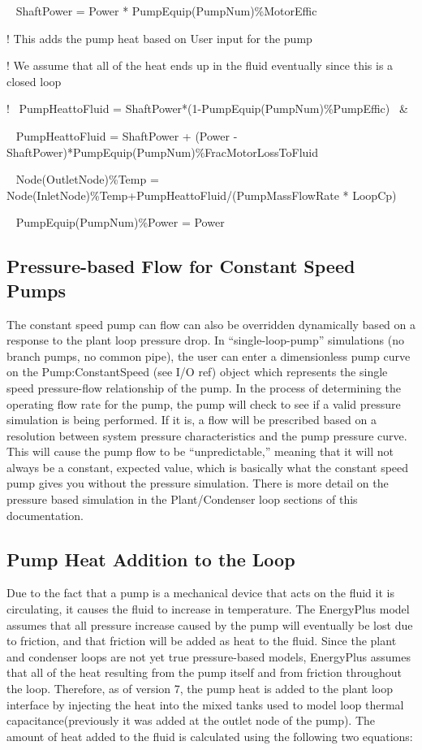 ~ ShaftPower = Power * PumpEquip(PumpNum)\%MotorEffic

! This adds the pump heat based on User input for the pump

! We assume that all of the heat ends up in the fluid eventually since this is a closed loop

! ~PumpHeattoFluid = ShaftPower*(1-PumpEquip(PumpNum)\%PumpEffic)~ \&

~ PumpHeattoFluid = ShaftPower + (Power - ShaftPower)*PumpEquip(PumpNum)\%FracMotorLossToFluid

~ Node(OutletNode)\%Temp = Node(InletNode)\%Temp+PumpHeattoFluid/(PumpMassFlowRate * LoopCp)

~ PumpEquip(PumpNum)\%Power = Power

\subsection{Pressure-based Flow for Constant Speed Pumps}\label{pressure-based-flow-for-constant-speed-pumps}

The constant speed pump can flow can also be overridden dynamically based on a response to the plant loop pressure drop. In ``single-loop-pump'' simulations (no branch pumps, no common pipe), the user can enter a dimensionless pump curve on the Pump:ConstantSpeed (see I/O ref) object which represents the single speed pressure-flow relationship of the pump. In the process of determining the operating flow rate for the pump, the pump will check to see if a valid pressure simulation is being performed. If it is, a flow will be prescribed based on a resolution between system pressure characteristics and the pump pressure curve. This will cause the pump flow to be ``unpredictable,'' meaning that it will not always be a constant, expected value, which is basically what the constant speed pump gives you without the pressure simulation. There is more detail on the pressure based simulation in the Plant/Condenser loop sections of this documentation.

\subsection{Pump Heat Addition to the Loop}\label{pump-heat-addition-to-the-loop}

Due to the fact that a pump is a mechanical device that acts on the fluid it is circulating, it causes the fluid to increase in temperature. The EnergyPlus model assumes that all pressure increase caused by the pump will eventually be lost due to friction, and that friction will be added as heat to the fluid. Since the plant and condenser loops are not yet true pressure-based models, EnergyPlus assumes that all of the heat resulting from the pump itself and from friction throughout the loop. Therefore, as of version 7, the pump heat is added to the plant loop interface by injecting the heat into the mixed tanks used to model loop thermal capacitance(previously it was added at the outlet node of the pump). The amount of heat added to the fluid is calculated using the following two equations:

